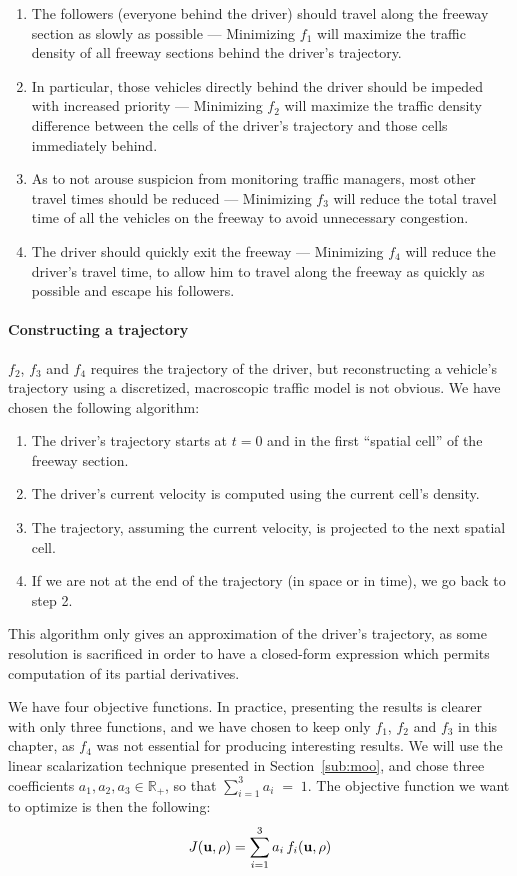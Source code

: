 \begin{enumerate}
\item The followers (everyone behind the driver) should travel along the freeway section as slowly as possible --- Minimizing $f_1$ will maximize the traffic density of all freeway sections behind the driver's trajectory.

\item In particular, those vehicles directly behind the driver should be impeded with increased priority --- Minimizing $f_2$ will maximize the traffic density difference between the cells of the driver's trajectory and those cells immediately behind.
\item As to not arouse suspicion from monitoring traffic managers, most other travel times should be reduced --- Minimizing $f_3$ will reduce the total travel time of all the vehicles on the freeway to avoid unnecessary congestion.
\item The driver should quickly exit the freeway --- Minimizing $f_4$ will reduce the driver's travel time, to allow him to travel along the freeway as quickly as possible and escape his followers.
\end{enumerate}


\paragraph{Constructing a trajectory}
$f_2$, $f_3$ and $f_4$ requires the trajectory of the driver, but reconstructing a vehicle's trajectory using a discretized, macroscopic traffic model is not obvious. We have chosen the following algorithm:
\begin{enumerate}
\item The driver's trajectory starts at $t = 0$ and in the first ``spatial cell'' of the freeway section.
\item The driver's current velocity is computed using the current cell's density.
\item The trajectory, assuming the current velocity, is projected to the next spatial cell.
\item If we are not at the end of the trajectory (in space or in time), we go back to step 2.
\end{enumerate}

This algorithm only gives an approximation of the driver's trajectory, as some resolution is sacrificed in order to have a closed-form expression which permits computation of its partial derivatives.


We have four objective functions. In practice, presenting the results is clearer with only three functions, and we have chosen to keep only $f_1$, $f_2$ and $f_3$ in this chapter, as $f_4$ was not essential for producing interesting results. We will use the linear scalarization technique presented in Section~\ref{sub:moo}, and chose three coefficients $a_1, a_2, a_3 \in \mathbb{R}_+$, so that $\sum_{i=1}^3 a_i \; = \; 1$. The objective function we want to optimize is then the following:
\begin{equation}
J \left( \vectorize{u}, \vectorize{\rho} \right) = \sum_{i=1}^3 a_i \, f_i \left( \vectorize{u}, \vectorize{\rho} \right)	
\end{equation}

